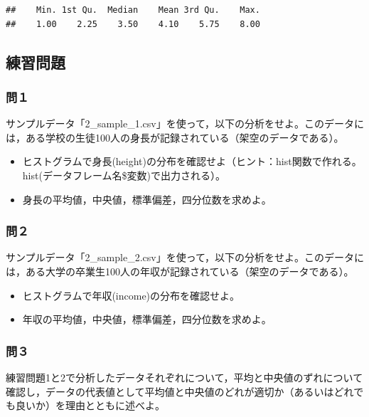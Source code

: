 \documentclass[]{article}
\providecommand{\tightlist}{%
  \setlength{\itemsep}{0pt}\setlength{\parskip}{0pt}}
\begin{document}
\begin{verbatim}
##    Min. 1st Qu.  Median    Mean 3rd Qu.    Max. 
##    1.00    2.25    3.50    4.10    5.75    8.00
\end{verbatim}

\subsection{練習問題}\label{-2}

\subsubsection{問１}\label{-3}

サンプルデータ「2\_sample\_1.csv」を使って，以下の分析をせよ。このデータには，ある学校の生徒100人の身長が記録されている（架空のデータである）。

\begin{itemize}
\tightlist
\item
  ヒストグラムで身長(height)の分布を確認せよ（ヒント：hist関数で作れる。hist(データフレーム名\$変数)で出力される）。\\
\item
  身長の平均値，中央値，標準偏差，四分位数を求めよ。
\end{itemize}

\subsubsection{問２}\label{-4}

サンプルデータ「2\_sample\_2.csv」を使って，以下の分析をせよ。このデータには，ある大学の卒業生100人の年収が記録されている（架空のデータである）。

\begin{itemize}
\tightlist
\item
  ヒストグラムで年収(income)の分布を確認せよ。\\
\item
  年収の平均値，中央値，標準偏差，四分位数を求めよ。
\end{itemize}

\subsubsection{問３}\label{-5}

練習問題1と2で分析したデータそれぞれについて，平均と中央値のずれについて確認し，データの代表値として平均値と中央値のどれが適切か（あるいはどれでも良いか）を理由とともに述べよ。
\end{document}
